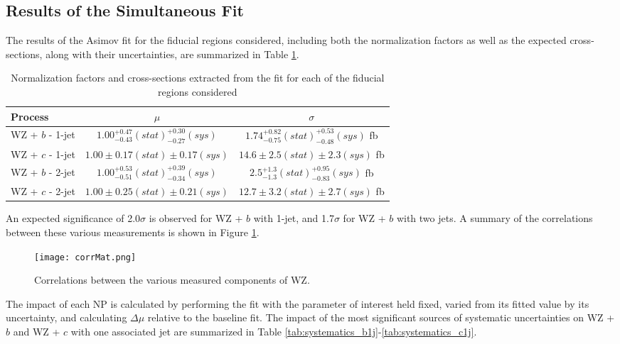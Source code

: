 \subsection{Results of the Simultaneous Fit}
\label{sec:resSum}

The results of the Asimov fit for the fiducial regions considered, including both the normalization factors as well as the expected cross-sections, along with their uncertainties, are summarized in Table \ref{tab:WZ_results}.

\hspace{-1in}\begin{table}[H]
\begin{adjustwidth}{-3em}{-3em}
\begin{center}
\begin{tabular}{|l|c|c|}
\hline
Process & $\mu$ & $\sigma$ \\
\hline
WZ + $b$ - 1-jet & $1.00^{+0.47}_{-0.43}(stat)^{+0.30}_{-0.27}(sys)$ & $1.74^{+0.82}_{-0.75}(stat)^{+0.53}_{-0.48}(sys)$ fb \\
WZ + $c$ - 1-jet & $1.00 \pm 0.17(stat) \pm 0.17(sys)$ & $14.6 \pm 2.5 (stat) \pm 2.3 (sys)$ fb \\
WZ + $b$ - 2-jet & $1.00^{+0.53}_{-0.51}(stat)^{+0.39}_{-0.34}(sys)$ & $2.5^{+1.3}_{-1.3}(stat)^{+0.95}_{-0.83}(sys)$ fb \\
WZ + $c$ - 2-jet & $1.00 \pm 0.25(stat) \pm 0.21(sys)$ & $12.7 \pm 3.2 (stat) \pm 2.7 (sys)$ fb \\
\hline
\end{tabular}
\caption{Normalization factors and cross-sections extracted from the fit for each of the fiducial regions considered}
\label{tab:WZ_results}
\end{center}
\end{adjustwidth}
\end{table}

An expected significance of 2.0$\sigma$ is observed for WZ + $b$ with 1-jet, and 1.7$\sigma$ for WZ + $b$ with two jets. A summary of the correlations between these various measurements is shown in Figure \ref{fig:corrMat}.

\begin{figure}[H]
  \center
  \texttt{[image: corrMat.png]}
  \caption{Correlations between the various measured components of WZ.}
  \label{fig:corrMat}
\end{figure}

The impact of each NP is calculated by performing the fit with the parameter of interest held fixed, varied from its fitted value by its uncertainty, and calculating $\Delta\mu$ relative to the baseline fit.  The impact of the most significant sources of systematic uncertainties on WZ + $b$ and WZ + $c$ with one associated jet are summarized in Table \ref{tab:systematics_b1j}-\ref{tab:systematics_c1j}. 

